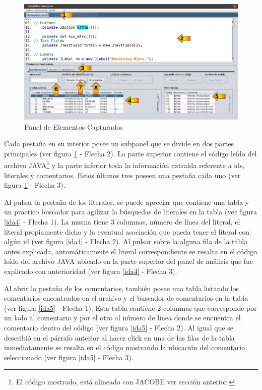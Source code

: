 \documentclass[a4paper,12pt]{report}
\begin{document}
\begin{figure}[h] %
\centerline{%
\includegraphics[scale= 0.5]{./ida_03.png}
}
\caption{Panel de Elementos Capturados}
\label{ida3}
\end{figure}

Cada pestaña en su interior posee un subpanel que se divide en dos partes principales (ver figura \ref{ida3} - Flecha 2). La parte superior contiene el código leído del archivo JAVA\footnote[1]{El código mostrado, está alineado con JACOBE ver sección anterior.} y la parte inferior toda la información extraída referente a ids, literales y comentarios. Estos últimos tres poseen una pestaña cada uno (ver figura \ref{ida3} - Flecha 3). 

Al pulsar la pestaña de los literales, se puede apreciar que contiene una tabla y un practico buscador para agilizar la búsquedas de literales en la tabla (ver figura \ref{ida4} - Flecha 1). La misma tiene 3 columnas, número de línea del literal, el literal propiamente dicho y la eventual asociación que pueda tener el literal con algún id (ver figura \ref{ida4} - Flecha 2). Al pulsar sobre la alguna fila de la tabla antes explicada, automáticamente el literal correspondiente se resalta en el código leído del archivo JAVA ubicado en la parte superior del panel de análisis que fue explicado con anterioridad (ver figura \ref{ida4} - Flecha 3).

Al abrir la pestaña de los comentarios, también posee una tabla listando los comentarios encontrados en el archivo y el buscador de comentarios en la tabla (ver figura \ref{ida5} - Flecha 1). Esta tabla contiene 2 columnas que corresponde por un lado al comentario y por el otro al número de línea donde se encuentra el comentario dentro del código (ver figura \ref{ida5} - Flecha 2). Al igual que se describió en el párrafo anterior al hacer click en una de las filas de la tabla inmediatamente se resalta en el código mostrando la ubicación del comentario seleccionado (ver figura \ref{ida5} - Flecha 3).
\end{document}
